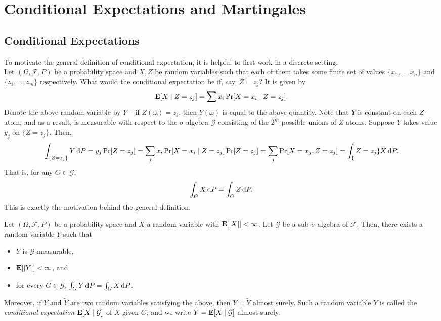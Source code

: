 \section{Conditional Expectations and Martingales}

\subsection{Conditional Expectations}

To motivate the general definition of conditional expectation, it is helpful to first work in a discrete setting.\\

Let $(\Omega,\mathcal{F},P)$ be a probability space and $X,Z$ be random variables such that each of them takes some finite set of values $\{x_1,\ldots,x_n\}$ and $\{z_1,\ldots,z_m\}$ respectively. What would the conditional expectation be if, say, $Z=z_j$? It is given by
\[ \textbf{E}[X\mid Z=z_j] = \sum x_i \Pr[X=x_i \mid Z=z_j]. \]
Denote the above random variable by $Y$ -- if $Z(\omega)=z_j$, then $Y(\omega)$ is equal to the above quantity. Note that $Y$ is constant on each $Z$-atom, and as a result, is measurable with respect to the $\sigma$-algebra $\mathcal{G}$ consisting of the $2^m$ possible unions of $Z$-atoms. Suppose $Y$ takes value $y_j$ on $\{Z=z_j\}$. Then,
\[ \int_{\{Z=z_j\}} Y\operatorname{d}\!{P} = y_j \Pr[Z=z_j] = \sum_j x_i \Pr[X=x_i\mid Z=z_j]\Pr[Z=z_j] = \sum_j \Pr[X=x_j, Z=z_j] = \int_\{Z=z_j\} X\operatorname{d}\!{P}. \]
That is, for any $G\in\mathcal{G}$,
\[ \int_G X\operatorname{d}\!{P} = \int_G Z\operatorname{d}\!{P}. \]
This is exactly the motivation behind the general definition.

\begin{fdef}
	Let $(\Omega,\mathcal{F},P)$ be a probability space and $X$ a random variable with $\textbf{E}[|X|]<\infty$. Let $\mathcal{G}$ be a sub-$\sigma$-algebra of $\mathcal{F}$. Then, there exists a random variable $Y$ such that
	\begin{itemize}
		\item $Y$ is $\mathcal{G}$-measurable,
		\item $\textbf{E}[|Y|]<\infty$, and
		\item for every $G\in\mathcal{G}$, $\int_G Y\operatorname{d}\!{P} = \int_G X\operatorname{d}\!{P}$.
	\end{itemize}
	Moreover, if $Y$ and $\tilde{Y}$ are two random variables satisfying the above, then $Y=\tilde{Y}$ almost surely. Such a random variable $Y$ is called the \textit{conditional expectation} $\textbf{E}[X\mid\mathcal{G}]$ of $X$ given $G$, and we write $Y=\textbf{E}[X\mid\mathcal{G}]$ almost surely.
\end{fdef}

